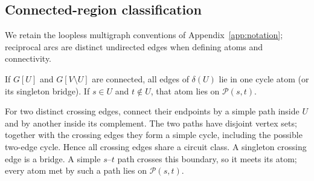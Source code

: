 \subsection{Connected-region classification}\label{app:connectedproof}
We retain the loopless multigraph conventions of
Appendix~\ref{app:notation}; reciprocal arcs are distinct undirected
edges when defining atoms and connectivity.

\begin{lemma}\label{lem:bondlocal}
If $G[U]$ and $G[V\setminus U]$ are connected, all edges of
$\delta(U)$ lie in one cycle atom (or its singleton bridge).
If $s\in U$ and $t\notin U$, that atom lies on $\mathcal P(s,t)$.
\end{lemma}
\begin{pf}
For two distinct crossing edges, connect their endpoints by a simple
path inside $U$ and by another inside its complement. The two paths
have disjoint vertex sets; together with the crossing edges they form
a simple cycle, including the possible two-edge cycle. Hence all
crossing edges share a circuit class. A singleton crossing edge is a
bridge. A simple $s$--$t$ path crosses this boundary, so it meets its
atom; every atom met by such a path lies on $\mathcal P(s,t)$.
\end{pf}


